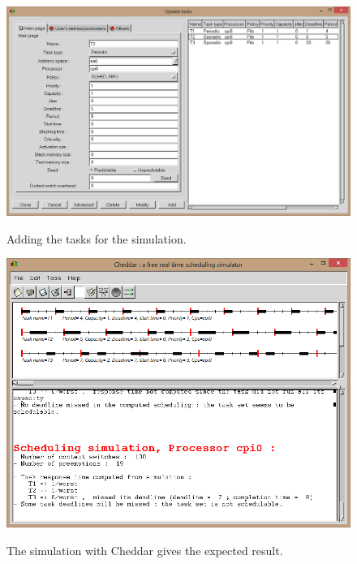 \documentclass[a4paper,12pt]{article}
\theoremstyle{definition}
\begin{document}
\begin{figure}
  \centering
  \includegraphics[scale=0.5]{task.png}\\
  \caption{Adding the tasks for the simulation.}\label{result}
\end{figure}

\begin{figure}
  \centering
  \includegraphics[scale=0.68]{result.png}\\
  \caption{The simulation with Cheddar gives the expected result.}\label{result}
\end{figure}
\newpage
\end{document}
